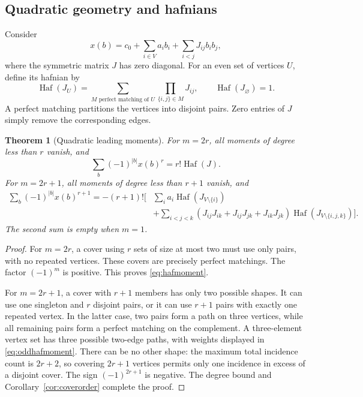 \documentclass[11pt,oneside]{article}
\numberwithin{equation}{section}
\newtheorem{theorem}{Theorem}[section]
\theoremstyle{definition}
\theoremstyle{remark}
\DeclareMathOperator{\Haf}{Haf}
\begin{document}
\subsection{Quadratic geometry and hafnians}
Consider
\begin{equation}
 x(b)=c_0+\sum_{i\in V}a_i b_i
          +\sum_{i<j}J_{ij}b_ib_j,
 \label{eq:quadratic}
\end{equation}
where the symmetric matrix \(J\) has zero diagonal. For an even set of vertices
\(U\), define its hafnian by
\begin{equation}
 \Haf(J_U)=\sum_{M\text{ perfect matching of }U}
                 \prod_{\{i,j\}\in M}J_{ij},
 \qquad \Haf(J_\varnothing)=1.
 \label{eq:haf}
\end{equation}
A perfect matching partitions the vertices into disjoint pairs. Zero entries
of \(J\) simply remove the corresponding edges.

\begin{theorem}[Quadratic leading moments]
\label{thm:haf}
For \(m=2r\), all moments of degree less than \(r\) vanish, and
\begin{equation}
 \sum_b(-1)^{|b|}x(b)^r=r!\Haf(J).
 \label{eq:hafmoment}
\end{equation}
For \(m=2r+1\), all moments of degree less than \(r+1\) vanish, and
\begin{equation}
\begin{split}
 \sum_b(-1)^{|b|}x(b)^{r+1}=-(r+1)!\Bigg[&
 \sum_i a_i\Haf(J_{V\setminus\{i\}})\\
 &+\sum_{i<j<k}(J_{ij}J_{ik}+J_{ij}J_{jk}+J_{ik}J_{jk})
                  \Haf(J_{V\setminus\{i,j,k\}})\Bigg].
\end{split}
\label{eq:oddhafmoment}
\end{equation}
The second sum is empty when \(m=1\).
\end{theorem}
\begin{proof}
For \(m=2r\), a cover using \(r\) sets of size at most two must use only
pairs, with no repeated vertices. These covers are precisely perfect matchings.
The factor \((-1)^m\) is positive. This proves \eqref{eq:hafmoment}.

For \(m=2r+1\), a cover with \(r+1\) members has only two possible shapes.
It can use one singleton and \(r\) disjoint pairs, or it can use \(r+1\) pairs
with exactly one repeated vertex. In the latter case, two pairs form a path
on three vertices, while all remaining pairs form a perfect matching on the
complement. A three-element vertex set has three possible two-edge paths,
with weights displayed in \eqref{eq:oddhafmoment}. There can be no other shape:
the maximum total incidence count is \(2r+2\), so covering \(2r+1\) vertices
permits only one incidence in excess of a disjoint cover. The sign
\((-1)^{2r+1}\) is negative. The degree bound and
Corollary~\ref{cor:coverorder} complete the proof.
\end{proof}
\end{document}
